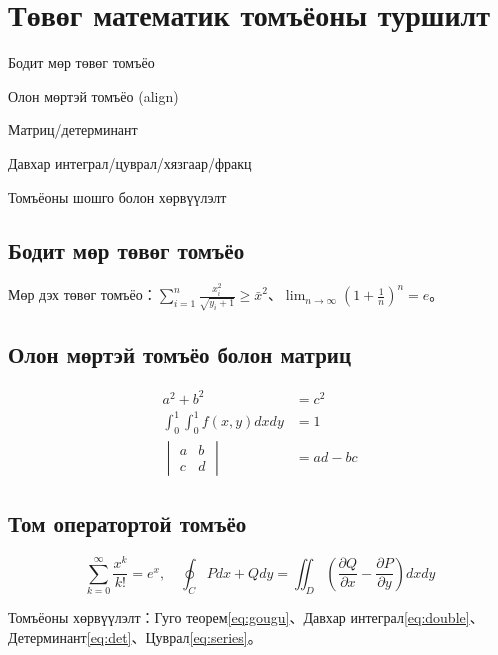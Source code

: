 \documentclass[nm]{../../elegantbook}
\begin{document}
\chapter{Төвөг математик томъёоны туршилт}
\begin{introduction}
\item Бодит мөр төвөг томъёо
\item Олон мөртэй томъёо (align)
\item Матриц/детерминант
\item Давхар интеграл/цуврал/хязгаар/фракц
\item Томъёоны шошго болон хөрвүүлэлт
\end{introduction}

\section{Бодит мөр төвөг томъёо}
Мөр дэх төвөг томъёо：$\sum_{i=1}^n \frac{x_i^2}{\sqrt{y_i+1}} \geq \bar{x}^2$、$\lim_{n\to\infty} \left(1+\frac{1}{n}\right)^n = e$。

\section{Олон мөртэй томъёо болон матриц}
\begin{align}
a^2 + b^2 &= c^2 \label{eq:gougu} \\
\int_{0}^{1}\int_{0}^{1} f(x,y) dxdy &= 1 \label{eq:double} \\
\begin{vmatrix}
a & b \\
c & d
\end{vmatrix} &= ad-bc \label{eq:det}
\end{align}

\section{Том оператортой томъёо}
\begin{equation}\label{eq:series}
\sum_{k=0}^{\infty} \frac{x^k}{k!} = e^x,\quad \oint_{C} Pdx+Qdy = \iint_{D}\left(\frac{\partial Q}{\partial x}-\frac{\partial P}{\partial y}\right)dxdy
\end{equation}

Томъёоны хөрвүүлэлт：Гуго теорем\eqref{eq:gougu}、Давхар интеграл\eqref{eq:double}、Детерминант\eqref{eq:det}、Цуврал\eqref{eq:series}。

\end{document}
